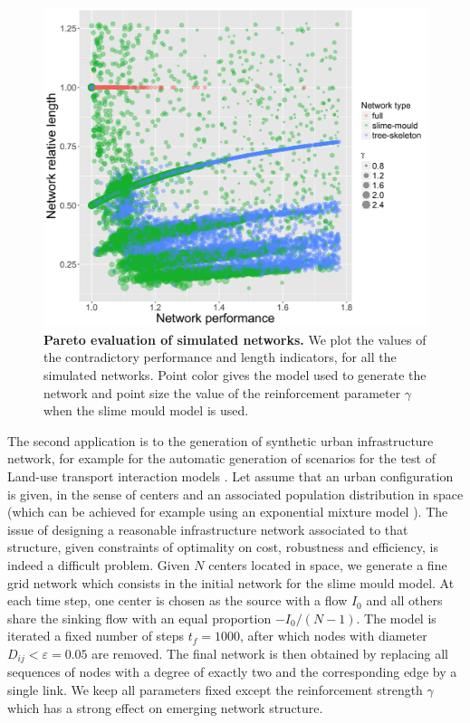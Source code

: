 \documentclass[runningheads,a4paper]{llncs}
\begin{document}
\begin{figure}[h!]
	\includegraphics[width=1.2\linewidth]{paretoSpeedLength.png}
	\caption{\textbf{Pareto evaluation of simulated networks.} We plot the values of the contradictory performance and length indicators, for all the simulated networks. Point color gives the model used to generate the network and point size the value of the reinforcement parameter $\gamma$ when the slime mould model is used.\label{fig:pareto}}
\end{figure}

The second application is to the generation of synthetic urban infrastructure network, for example for the automatic generation of scenarios for the test of Land-use transport interaction models \cite{wegener2004land}. Let assume that an urban configuration is given, in the sense of centers and an associated population distribution in space (which can be achieved for example using an exponential mixture model \cite{anas1998urban}). The issue of designing a reasonable infrastructure network associated to that structure, given constraints of optimality on cost, robustness and efficiency, is indeed a difficult problem. Given $N$ centers located in space, we generate a fine grid network which consists in the initial network for the slime mould model. At each time step, one center is chosen as the source with a flow $I_0$ and all others share the sinking flow with an equal proportion $-I_0 / (N - 1)$. The model is iterated a fixed number of steps $t_f = 1000$, after which nodes with diameter $D_{ij} < \varepsilon = 0.05$ are removed. The final network is then obtained by replacing all sequences of nodes with a degree of exactly two and the corresponding edge by a single link. We keep all parameters fixed except the reinforcement strength $\gamma$ which has a strong effect on emerging network structure.
\end{document}
